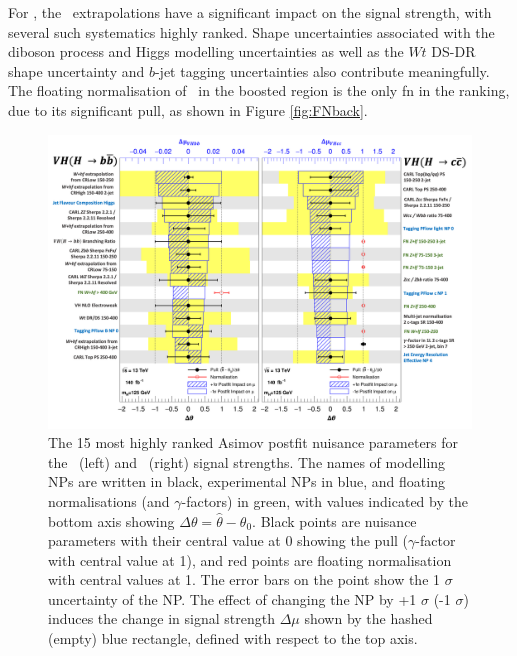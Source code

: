 For \vhb, the \whf\ extrapolations have a significant impact on the signal strength, with several such systematics highly ranked. Shape uncertainties associated with the diboson process and Higgs modelling uncertainties as well as the $Wt$ DS-DR shape uncertainty and $b$-jet tagging uncertainties also contribute meaningfully. The floating normalisation of \whf\ in the boosted region is the only \gls{fn} in the ranking, due to its significant pull, as shown in Figure \ref{fig:FNback}.

\begin{figure}[h!]
    \centering
    \includegraphics[width=\textwidth]{Images/VH/Fit/fromSlides/ranking.png}
    \caption{The 15 most highly ranked Asimov postfit nuisance parameters for the \vhb\ (left) and \vhc\ (right) signal strengths. The names of modelling NPs are written in black, experimental NPs in blue, and floating normalisations (and $\gamma$-factors) in green, with values indicated by the bottom axis showing $\Delta \theta = \hat{\theta} - \theta_0$. Black points are nuisance parameters with their central value at 0 showing the pull ($\gamma$-factor with central value at 1), and red points are floating normalisation with central values at 1. The error bars on the point show the 1 $\sigma$ uncertainty of the NP. The effect of changing the NP by +1 $\sigma$ (-1 $\sigma$) induces the change in signal strength $\Delta\mu$ shown by the hashed (empty) blue rectangle, defined with respect to the top axis.}
    \label{fig:rankingPostfit}
\end{figure}

